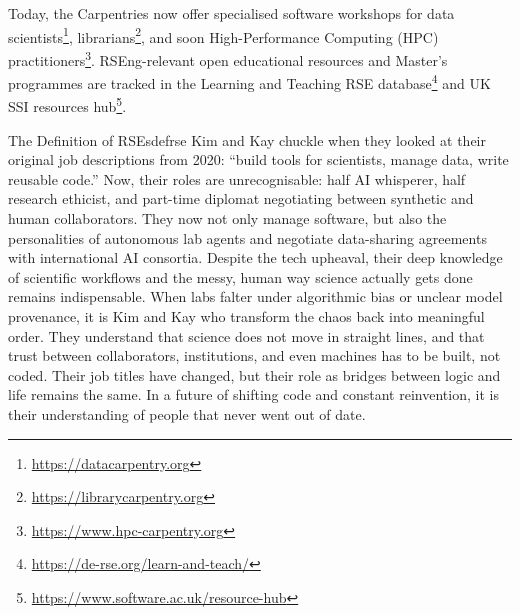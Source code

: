 \documentclass{eceasst}
\begin{document}
Today, the Carpentries now offer specialised software workshops
for data scientists\footnote{\url{https://datacarpentry.org}},
librarians\footnote{\url{https://librarycarpentry.org}},
and soon High-Performance Computing (HPC) practitioners\footnote{\url{https://www.hpc-carpentry.org}}.
RSEng-relevant open educational resources and Master's programmes are tracked
in the Learning and Teaching RSE database\footnote{\url{https://de-rse.org/learn-and-teach/}}
and UK SSI resources hub\footnote{\url{https://www.software.ac.uk/resource-hub}}.


\begin{story}{The Definition of RSEs}{defrse}
Kim and Kay chuckle when they looked at their original job descriptions from 2020: ``build tools for scientists, manage data, write reusable code.''
Now, their roles are unrecognisable: half AI whisperer, half research ethicist, and part-time diplomat negotiating between synthetic and human collaborators.
They now not only manage software, but also the personalities of autonomous lab agents and negotiate data-sharing agreements with international AI consortia.
Despite the tech upheaval, their deep knowledge of scientific workflows and the messy, human way science actually gets done remains indispensable.
When labs falter under algorithmic bias or unclear model provenance, it is Kim and Kay who transform the chaos back into meaningful order.
They understand that science does not move in straight lines, and that trust between collaborators, institutions, and even machines has to be built, not coded.
Their job titles have changed, but their role as bridges between logic and life remains the same.
In a future of shifting code and constant reinvention, it is their understanding of people that never went out of date.

\end{story}
\end{document}

